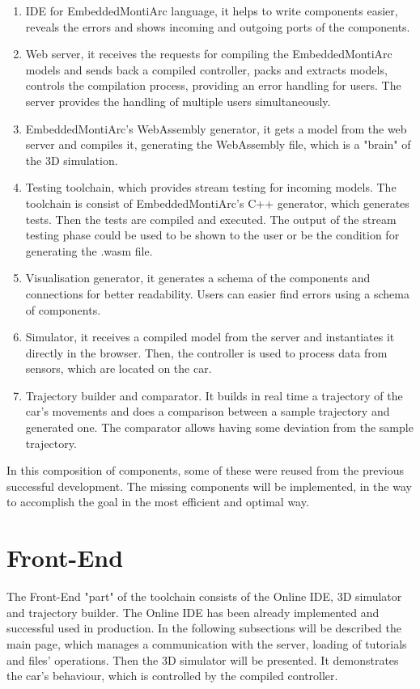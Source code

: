 \begin{enumerate}
    \item IDE for EmbeddedMontiArc language, it helps to write components easier, reveals the errors and shows incoming and outgoing ports of the components.
    \item Web server, it receives the requests for compiling the EmbeddedMontiArc models and sends back a compiled controller, packs and extracts models, controls the compilation process, providing an error handling for users. The server provides the handling of multiple users simultaneously.
    \item EmbeddedMontiArc's WebAssembly generator, it gets a model from the web server and compiles it, generating the WebAssembly file, which is a "brain" of the 3D simulation.
    \item Testing toolchain, which provides stream testing for incoming models. The toolchain is consist of EmbeddedMontiArc's C++ generator, which generates tests. Then the tests are compiled and executed. The output of the stream testing phase could be used to be shown to the user or be the condition for generating the .wasm file.
    \item Visualisation generator, it generates a schema of the components and connections for better readability. Users can easier find errors using a schema of components.
    \item Simulator, it receives a compiled model from the server and instantiates it directly in the browser. Then, the controller is used to process data from sensors, which are located on the car.
    \item Trajectory builder and comparator. It builds in real time a trajectory of the car's movements and does a comparison between a sample trajectory and generated one. The comparator allows having some deviation from the sample trajectory.
\end{enumerate}
In this composition of components, some of these were reused from the previous successful development. The missing components will be implemented, in the way to accomplish the goal in the most efficient and optimal way.

\section{Front-End}
The Front-End "part" of the toolchain consists of the Online IDE, 3D simulator and trajectory builder. The Online IDE has been already implemented and successful used in production. In the following subsections will be described the main page, which manages a communication with the server, loading of tutorials and files' operations. Then the 3D simulator will be presented. It demonstrates the car's behaviour, which is controlled by the compiled controller. 

